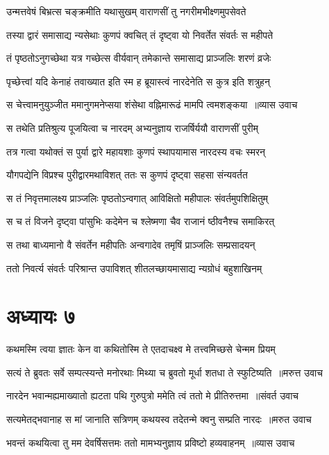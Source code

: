 \twolineshloka
{उन्मत्तवेषं बिभ्रत्स चङ्क्रमीति यथासुखम्}
{वाराणसीं तु नगरीमभीक्ष्णमुपसेवते}


\twolineshloka
{तस्या द्वारं समासाद्य न्यसेथाः कुणपं क्वचित्}
{तं दृष्ट्वा यो निवर्तेत संवर्तः स महीपते}


\twolineshloka
{तं पृष्ठतोऽनुगच्छेथा यत्र गच्छेत्स वीर्यवान्}
{तमेकान्ते समासाद्य प्राञ्जलिः शरणं व्रजेः}


\twolineshloka
{पृच्छेत्त्वां यदि केनाहं तवाख्यात इति स्म ह}
{ब्रूयास्त्वं नारदेनेति स कुत्र इति शत्रुहन्}


\threelineshloka
{स चेत्त्वामनुयुञ्जीत ममानुगमनेप्सया}
{शंसेथा वह्निमारूढं मामपि त्वमशङ्कया ॥व्यास उवाच}
{}


\twolineshloka
{स तथेति प्रतिश्रुत्य पूजयित्वा च नारदम्}
{अभ्यनुज्ञाय राजर्षिर्ययौ वाराणसीं पुरीम्}


\twolineshloka
{तत्र गत्वा यथोक्तं स पुर्या द्वारे महायशाः}
{कुणपं स्थापयामास नारदस्य वचः स्मरन्}


\twolineshloka
{यौगपद्येनि विप्रश्च पुरीद्वारमथाविशत्}
{ततः स कुणपं दृष्ट्वा सहसा संन्यवर्तत}


\twolineshloka
{स तं निवृत्तमालक्ष्य प्राञ्जलिः पृष्ठतोऽन्वगात्}
{आविक्षितो महीपालः संवर्तमुपशिक्षितुम्}


\twolineshloka
{स च तं विजने दृष्ट्वा पांसुभिः कदेमेन च}
{श्लेष्मणा चैव राजानं ष्ठीवनैश्च समाकिरत्}


\twolineshloka
{स तथा बाध्यमानो वै संवर्तेन महीपतिः}
{अन्वगादेव तमृषिं प्राञ्जलिः सम्प्रसादयन्}


\twolineshloka
{ततो निवर्त्य संवर्तः परिश्रान्त उपाविशत्}
{शीतलच्छायमासाद्य न्यग्रोधं बहुशाखिनम्}


\chapter{अध्यायः ७}
\twolineshloka
{कथमस्मि त्वया ज्ञातः केन वा कथितोस्मि ते}
{एतदाचक्ष्व मे तत्त्वमिच्छसे चेन्मम प्रियम्}


\threelineshloka
{सत्यं ते ब्रुवतः सर्वे सम्पत्स्यन्ते मनोरथाः}
{मिथ्या च ब्रुवतो मूर्धा शतधा ते स्फुटिष्यति ॥मरुत्त उवाच}
{}


\threelineshloka
{नारदेन भवान्मह्यमाख्यातो ह्यटता पथि}
{गुरुपुत्रो ममेति त्वं ततो मे प्रीतिरुत्तमा ॥संवर्त उवाच}
{}


\threelineshloka
{सत्यमेतद्भवानाह स मां जानाति सत्रिणम्}
{कथयस्व तदेतन्मे क्वनु सम्प्रति नारदः ॥मरुत उवाच}
{}


\threelineshloka
{भवन्तं कथयित्वा तु मम देवर्षिसत्तमः}
{ततो मामभ्यनुज्ञाय प्रविष्टो हव्यवाहनम् ॥व्यास उवाच}
{}


